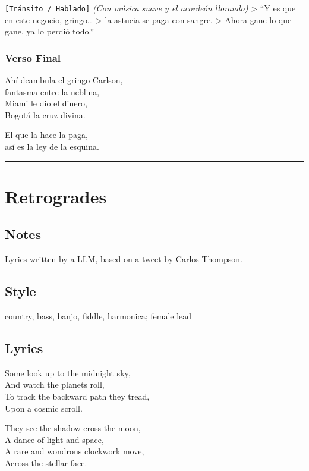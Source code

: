 \texttt{{[}Tránsito\ /\ Hablado{]}} \emph{(Con música suave y el
acordeón llorando)} \textgreater{} ``Y es que en este negocio,
gringo\ldots{} \textgreater{} la astucia se paga con sangre.
\textgreater{} Ahora gane lo que gane, ya lo perdió todo.''

\subsubsection{Verso Final}\label{verso-final}

Ahí deambula el gringo Carlson,\\
fantasma entre la neblina,\\
Miami le dio el dinero,\\
Bogotá la cruz divina.

El que la hace la paga,\\
así es la ley de la esquina.

\begin{center}\rule{0.5\linewidth}{0.5pt}\end{center}

\section{Retrogrades}\label{retrogrades}

\subsection{Notes}\label{notes-1}

Lyrics written by a LLM, based on a tweet by Carlos Thompson.

\subsection{Style}\label{style-1}

country, bass, banjo, fiddle, harmonica; female lead

\subsection{Lyrics}\label{lyrics-1}

Some look up to the midnight sky,\\
And watch the planets roll,\\
To track the backward path they tread,\\
Upon a cosmic scroll.

They see the shadow cross the moon,\\
A dance of light and space,\\
A rare and wondrous clockwork move,\\
Across the stellar face.

